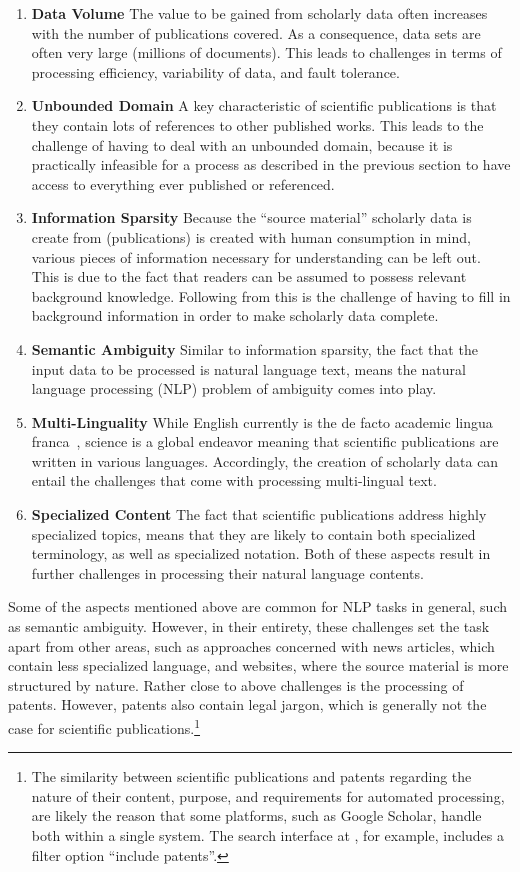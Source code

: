 \begin{enumerate}
    \item \textbf{Data Volume} The value to be gained from scholarly data often increases with the number of publications covered. As a consequence, data sets are often very large (millions of documents). This leads to challenges in terms of processing efficiency, variability of data, and fault tolerance.
    \item \textbf{Unbounded Domain} A key characteristic of scientific publications is that they contain lots of references to other published works. This leads to the challenge of having to deal with an unbounded domain, because it is practically infeasible for a process as described in the previous section to have access to everything ever published or referenced.
    \item \textbf{Information Sparsity} Because the ``source material'' scholarly data is create from (publications) is created with human consumption in mind, various pieces of information necessary for understanding can be left out. This is due to the fact that readers can be assumed to possess relevant background knowledge. Following from this is the challenge of having to fill in background information in order to make scholarly data complete.
    \item \textbf{Semantic Ambiguity} Similar to information sparsity, the fact that the input data to be processed is natural language text, means the natural language processing (NLP) problem of ambiguity comes into play.
    \item \textbf{Multi-Linguality} While English currently is the de facto academic lingua franca~\cite{Montgomery2013}, science is a global endeavor meaning that scientific publications are written in various languages. Accordingly, the creation of scholarly data can entail the challenges that come with processing multi-lingual text.
    \item \textbf{Specialized Content} The fact that scientific publications address highly specialized topics, means that they are likely to contain both specialized terminology, as well as specialized notation. Both of these aspects result in further challenges in processing their natural language contents.
\end{enumerate}

Some of the aspects mentioned above are common for NLP tasks in general, such as semantic ambiguity. However, in their entirety, these challenges set the task apart from other areas, such as approaches concerned with news articles, which contain less specialized language, and websites, where the source material is more structured by nature. Rather close to above challenges is the processing of patents. However, patents also contain legal jargon, which is generally not the case for scientific publications.\footnote{The similarity between scientific publications and patents regarding the nature of their content, purpose, and requirements for automated processing, are likely the reason that some platforms, such as Google Scholar, handle both within a single system. The search interface at , for example, includes a filter option ``include patents''.}

